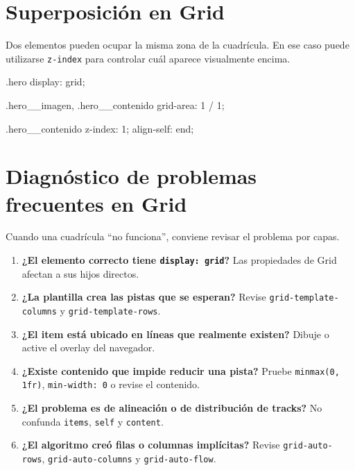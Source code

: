 \documentclass[11pt]{article}
\begin{document}
\section{Superposición en Grid}

Dos elementos pueden ocupar la misma zona de la cuadrícula. En ese caso puede
utilizarse \texttt{z-index} para controlar cuál aparece visualmente encima.

\begin{csscodedark}
.hero {
    display: grid;
}

.hero__imagen,
.hero__contenido {
    grid-area: 1 / 1;
}

.hero__contenido {
    z-index: 1;
    align-self: end;
}
\end{csscodedark}

\begin{center}
\end{center}


\section{Diagnóstico de problemas frecuentes en Grid}

Cuando una cuadrícula ``no funciona'', conviene revisar el problema por capas.

\begin{enumerate}
    \item \textbf{¿El elemento correcto tiene \texttt{display: grid}?}
    Las propiedades de Grid afectan a sus hijos directos.
    \item \textbf{¿La plantilla crea las pistas que se esperan?}
    Revise \texttt{grid-template-columns} y \texttt{grid-template-rows}.
    \item \textbf{¿El item está ubicado en líneas que realmente existen?}
    Dibuje o active el overlay del navegador.
    \item \textbf{¿Existe contenido que impide reducir una pista?}
    Pruebe \texttt{minmax(0, 1fr)}, \texttt{min-width: 0} o revise el contenido.
    \item \textbf{¿El problema es de alineación o de distribución de tracks?}
    No confunda \texttt{items}, \texttt{self} y \texttt{content}.
    \item \textbf{¿El algoritmo creó filas o columnas implícitas?}
    Revise \texttt{grid-auto-rows}, \texttt{grid-auto-columns} y
    \texttt{grid-auto-flow}.
\end{enumerate}
\end{document}
